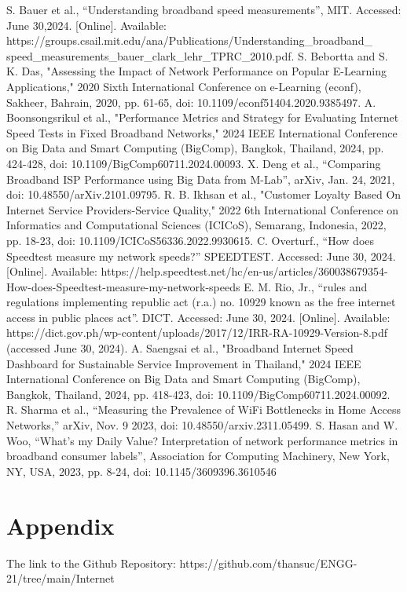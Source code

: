\documentclass[conference]{IEEEtran}
\begin{document}
\begin{thebibliography}{00}
 S. Bauer et al., “Understanding broadband speed measurements”, MIT. Accessed: June 30,2024. [Online]. Available: https://groups.csail.mit.edu/ana/Publications/Understanding\_broadband\_
speed\_measurements\_bauer\_clark\_lehr\_TPRC\_2010.pdf.
 S. Bebortta and S. K. Das, "Assessing the Impact of Network Performance on Popular E-Learning Applications," 2020 Sixth International Conference on e-Learning (econf), Sakheer, Bahrain, 2020, pp. 61-65, doi: 10.1109/econf51404.2020.9385497.
 A. Boonsongsrikul et al., "Performance Metrics and Strategy for Evaluating Internet Speed Tests in Fixed Broadband Networks," 2024 IEEE International Conference on Big Data and Smart Computing (BigComp), Bangkok, Thailand, 2024, pp. 424-428, doi: 10.1109/BigComp60711.2024.00093.
 X. Deng et al., “Comparing Broadband ISP Performance using Big Data from M-Lab”, arXiv, Jan. 24, 2021, doi: 10.48550/arXiv.2101.09795.
 R. B. Ikhsan et al., "Customer Loyalty Based On Internet Service Providers-Service Quality," 2022 6th International Conference on Informatics and Computational Sciences (ICICoS), Semarang, Indonesia, 2022, pp. 18-23, doi: 10.1109/ICICoS56336.2022.9930615.
 C. Overturf., “How does Speedtest measure my network speeds?” SPEEDTEST. Accessed: June 30, 2024. [Online]. Available: https://help.speedtest.net/hc/en-us/articles/360038679354-How-does-Speedtest-measure-my-network-speeds
 E. M. Rio, Jr.,  “rules and regulations implementing republic act (r.a.) no. 10929 known as the free internet access in public places act”. DICT. Accessed: June 30, 2024. [Online]. Available: https://dict.gov.ph/wp-content/uploads/2017/12/IRR-RA-10929-Version-8.pdf (accessed June 30, 2024).
 A. Saengsai et al., "Broadband Internet Speed Dashboard for Sustainable Service Improvement in Thailand," 2024 IEEE International Conference on Big Data and Smart Computing (BigComp), Bangkok, Thailand, 2024, pp. 418-423, doi: 10.1109/BigComp60711.2024.00092. 
 R. Sharma et al., “Measuring the Prevalence of WiFi Bottlenecks in Home Access Networks,” arXiv, Nov. 9 2023, doi: 10.48550/arxiv.2311.05499.
 S. Hasan and W. Woo, “What's my Daily Value? Interpretation of network performance metrics in broadband consumer labels”, Association for Computing Machinery, New York, NY, USA, 2023, pp. 8-24, doi: 10.1145/3609396.3610546

\end{thebibliography}

\newpage
\section{Appendix}
The link to the Github Repository: https://github.com/thansuc/ENGG-21/tree/main/Internet%
\end{document}
